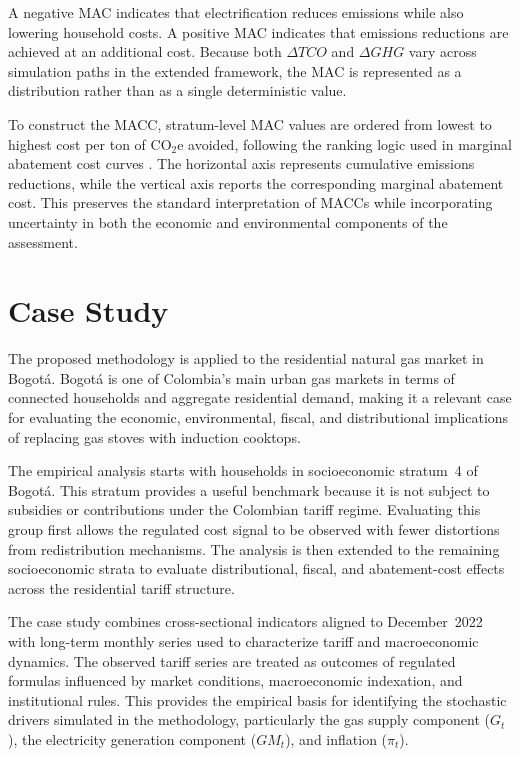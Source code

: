 \documentclass[authoryear,preprint,review,10pt]{elsarticle}
\begin{document}
A negative MAC indicates that electrification reduces emissions while also lowering household costs. A positive MAC indicates that emissions reductions are achieved at an additional cost. Because both $\Delta TCO$ and $\Delta GHG$ vary across simulation paths in the extended framework, the MAC is represented as a distribution rather than as a single deterministic value.

To construct the MACC, stratum-level MAC values are ordered from lowest to highest cost per ton of CO$_2$e avoided, following the ranking logic used in marginal abatement cost curves \citep{clerc2013desarrollo}. The horizontal axis represents cumulative emissions reductions, while the vertical axis reports the corresponding marginal abatement cost. This preserves the standard interpretation of MACCs while incorporating uncertainty in both the economic and environmental components of the assessment.

\section{Case Study}
\label{case study}

The proposed methodology is applied to the residential natural gas market in Bogotá. Bogotá is one of Colombia's main urban gas markets in terms of connected households and aggregate residential demand, making it a relevant case for evaluating the economic, environmental, fiscal, and distributional implications of replacing gas stoves with induction cooktops.

The empirical analysis starts with households in socioeconomic stratum~4 of Bogotá. This stratum provides a useful benchmark because it is not subject to subsidies or contributions under the Colombian tariff regime. Evaluating this group first allows the regulated cost signal to be observed with fewer distortions from redistribution mechanisms. The analysis is then extended to the remaining socioeconomic strata to evaluate distributional, fiscal, and abatement-cost effects across the residential tariff structure.

The case study combines cross-sectional indicators aligned to December~2022 with long-term monthly series used to characterize tariff and macroeconomic dynamics. The observed tariff series are treated as outcomes of regulated formulas influenced by market conditions, macroeconomic indexation, and institutional rules. This provides the empirical basis for identifying the stochastic drivers simulated in the methodology, particularly the gas supply component ($G_t$), the electricity generation component ($GM_t$), and inflation ($\pi_t$).
\end{document}
